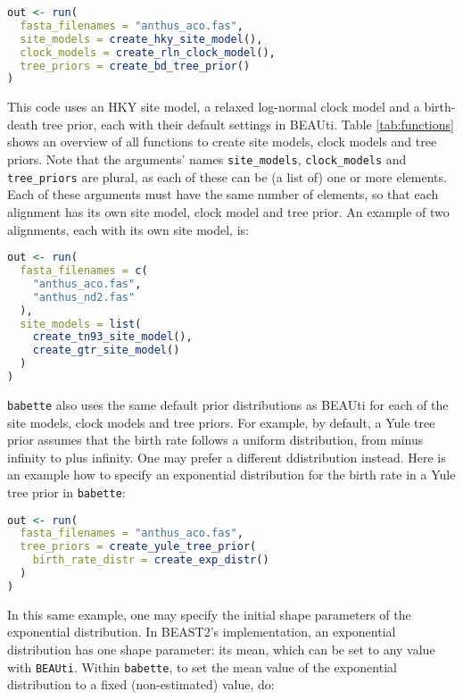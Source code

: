 \documentclass{article}
\begin{document}
\begin{lstlisting}[language=R, floatplacement=H]
out <- run(
  fasta_filenames = "anthus_aco.fas",
  site_models = create_hky_site_model(),
  clock_models = create_rln_clock_model(),
  tree_priors = create_bd_tree_prior()
)
\end{lstlisting}
This code uses an HKY site model, a relaxed log-normal clock model and a 
birth-death tree prior, each with their default settings in BEAUti.
Table \ref{tab:functions} shows an overview of all functions to 
create site models, clock models and tree priors.
Note that the arguments' names \verb;site_models;, \verb;clock_models; 
and \verb;tree_priors; are plural, as each of these
can be (a list of) one or more elements. Each of these arguments must 
have the same number of elements, so that each alignment has its
own site model, clock model and tree prior. 
An example of two alignments, each with its own site model, is:

\begin{lstlisting}[language=R, floatplacement=H]
out <- run(
  fasta_filenames = c(
    "anthus_aco.fas", 
    "anthus_nd2.fas"
  ),
  site_models = list(
    create_tn93_site_model(), 
    create_gtr_site_model()
  )
)
\end{lstlisting}
\verb;babette; also uses the same default prior distributions as BEAUti 
for each of the site models, clock models and tree priors. 
For example, by default, a Yule tree prior assumes that the birth rate 
follows a uniform distribution, 
from minus infinity to plus infinity. 
One may prefer a different ddistribution instead. 
Here is an example how to specify an exponential distribution for
the birth rate in a Yule tree prior in \verb;babette;:

\begin{lstlisting}[language=R, floatplacement=H]
out <- run(
  fasta_filenames = "anthus_aco.fas",
  tree_priors = create_yule_tree_prior(
    birth_rate_distr = create_exp_distr()    
  )
)
\end{lstlisting}
In this same example, one may specify
the initial shape parameters of the exponential distribution.
In BEAST2's implementation, an exponential distribution 
has one shape parameter: its mean, which can be set to any
value with \verb;BEAUti;. Within \verb;babette;, to set the 
mean value of the exponential distribution to a 
fixed (non-estimated) value, do: 
\end{document}
